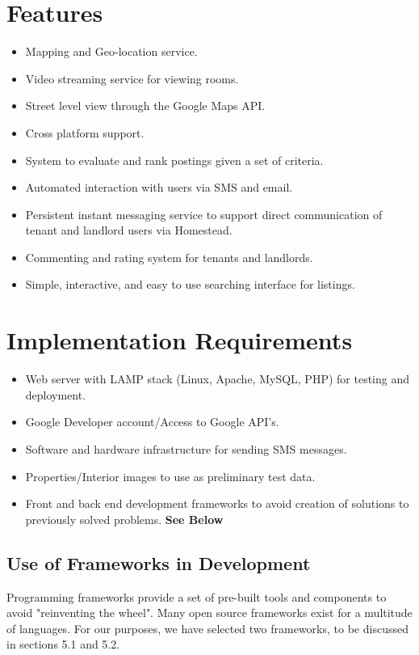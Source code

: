 \documentclass[14pt]{article}
\begin{document}
\section{Features}
\begin{itemize}
	\item Mapping and Geo-location service.
	\item Video streaming service for viewing rooms.
	\item Street level view through the Google Maps API.
	\item Cross platform support.
	\item System to evaluate and rank postings given a set of criteria.
	\item Automated interaction with users via SMS and email.
	\item Persistent instant messaging service to support direct communication of tenant and landlord users via Homestead.
	\item Commenting and rating system for tenants and landlords.
	\item Simple, interactive, and easy to use searching interface for listings.
\end{itemize}

\section{Implementation Requirements}
\begin{itemize}
	\item Web server with LAMP stack (Linux, Apache, MySQL, PHP) for testing and deployment.
	\item Google Developer account/Access to Google API's.
	\item Software and hardware infrastructure for sending SMS messages.
	\item Properties/Interior images to use as preliminary test data.
	\item Front and back end development frameworks to avoid creation of solutions to previously solved problems. \textbf{See Below}
\end{itemize}
\subsection{Use of Frameworks in Development}
Programming frameworks provide a set of pre-built tools and components to avoid "reinventing the wheel". Many open source frameworks exist for a multitude of languages. For our purposes, we have selected two frameworks, to be discussed in sections 5.1 and 5.2.
\end{document}
